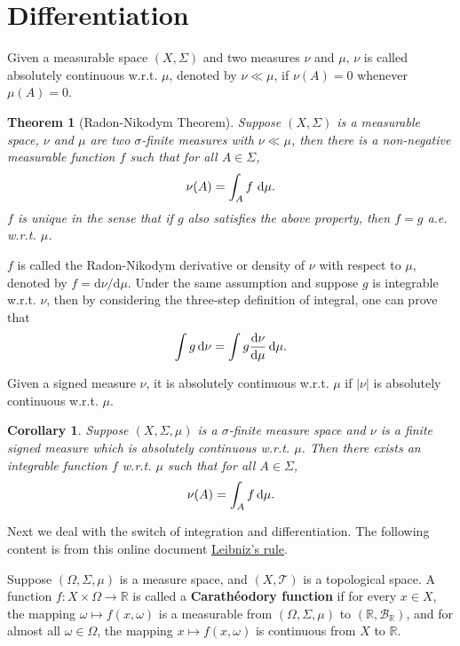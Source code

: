 \documentclass[openany]{book}
\newtheorem{corollary}{Corollary}[chapter]
\newtheorem{theorem}{Theorem}[chapter]
\theoremstyle{definition}
\theoremstyle{remark}
\begin{document}
\section{Differentiation}
Given a measurable space $(X,\Sigma)$ and two measures $\nu$ and $\mu$, $\nu$ is called absolutely continuous w.r.t. $\mu$, denoted by $\nu\ll\mu$, if $\nu(A)=0$ whenever $\mu(A)=0$.
\begin{theorem}[Radon-Nikodym Theorem]
    Suppose $(X,\Sigma)$ is a measurable space, $\nu$ and $\mu$ are two $\sigma$-finite measures with $\nu\ll\mu$, then there is a non-negative measurable function $f$ such that for all $A\in\Sigma$,
    \begin{equation*}
        \nu(A)=\int_Af\,\dif\mu.
    \end{equation*}
    $f$ is unique in the sense that if $g$ also satisfies the above property, then $f=g$ a.e. w.r.t. $\mu$.
\end{theorem}
$f$ is called the Radon-Nikodym derivative or density of $\nu$ with respect to $\mu$, denoted by $f=\mathrm{d}\nu/\mathrm{d}\mu$. Under the same assumption and suppose $g$ is integrable w.r.t. $\nu$, then by considering the three-step definition of integral, one can prove that
\begin{equation*}
    \int g \dif\nu=\int g \frac{\dif\nu}{\dif\mu}\dif\mu.
\end{equation*}

Given a signed measure $\nu$, it is absolutely continuous w.r.t. $\mu$ if $|\nu|$ is absolutely continuous w.r.t. $\mu$.
\begin{corollary}
    Suppose $(X,\Sigma,\mu)$ is a $\sigma$-finite measure space and $\nu$ is a finite signed measure which is absolutely continuous w.r.t. $\mu$. Then there exists an integrable function $f$ w.r.t. $\mu$ such that for all $A\in\Sigma$,
    \begin{equation*}
        \nu(A)=\int_Af \dif\mu.
    \end{equation*}
\end{corollary}

Next we deal with the switch of integration and differentiation. The following content is from this online document \href{http://people.hss.caltech.edu/~kcb/Notes/LeibnizRule.pdf}{Leibniz's rule}.

Suppose $(\Omega,\Sigma,\mu)$ is a measure space, and $(X,\mathcal{T})$ is a topological space. A function $f:X\times\Omega\to \mathbb{R}$ is called a \textbf{Carath\'{e}odory function} if for every $x\in X$, the mapping $\omega\mapsto f(x,\omega)$ is a measurable from $(\Omega,\Sigma,\mu)$ to $(\mathbb{R},\mathcal{B}_{\mathbb{R}})$, and for almost all $\omega\in\Omega$, the mapping $x\mapsto f(x,\omega)$ is continuous from $X$ to $\mathbb{R}$.
\end{document}
